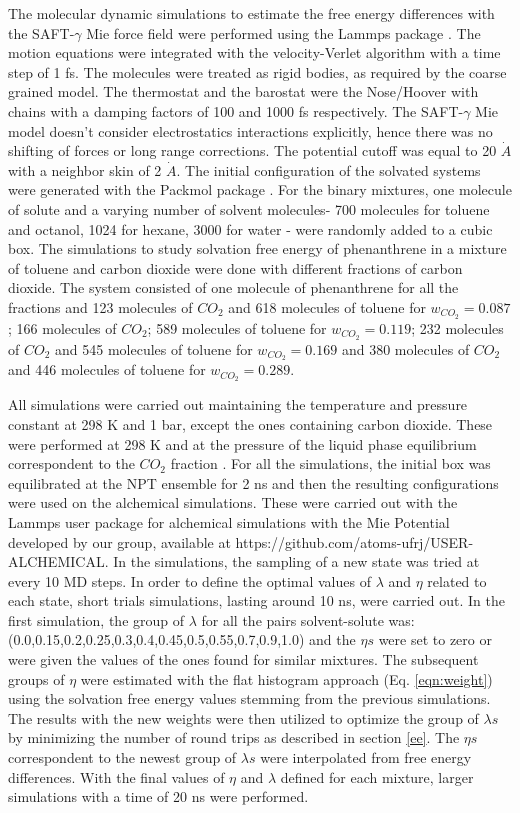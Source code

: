 The molecular dynamic simulations to estimate the free energy differences with the SAFT-$\gamma$ Mie force field were performed using the Lammps package \cite{lammps}. The motion equations were integrated with the velocity-Verlet algorithm \cite{verlet} with a time step of 1 fs. The molecules were treated as rigid bodies, as required by the coarse grained model. The thermostat and the barostat were the Nose/Hoover with chains with a damping factors of 100 and 1000 fs respectively. The SAFT-$\gamma$ Mie model doesn't consider electrostatics interactions explicitly, hence there was no shifting of forces or long range corrections. The potential cutoff was equal to 20 $\dot{A}$ \cite{muller2017} with a neighbor skin of 2 $\dot{A}$. The initial configuration of the  solvated systems were generated with the Packmol package \cite{packmol}. For the binary mixtures, one molecule of solute and a varying number of solvent molecules- 700 molecules for toluene and octanol, 1024 for hexane, 3000 for water - were randomly added to a cubic box. The simulations to study solvation free energy of phenanthrene in a mixture of toluene and carbon dioxide were done with different fractions of carbon dioxide. The  system consisted of one molecule of phenanthrene for all the fractions and 123 molecules of $CO_{2}$ and 618 molecules of toluene for $w_{CO_{2}} = 0.087$; 166 molecules of $CO_{2}$; 589 molecules of toluene for $w_{CO_{2}} = 0.119$; 232 molecules of $CO_{2}$ and 545 molecules of toluene for $w_{CO_{2}} = 0.169$ and 380 molecules of $CO_{2}$ and 446 molecules of toluene for $w_{CO_{2}} = 0.289$.

All simulations were carried out maintaining the temperature and pressure constant at 298 K and 1 bar, except the ones containing carbon dioxide. These were performed at 298 K and at the pressure of the liquid phase equilibrium correspondent to the $CO_{2}$ fraction \cite{co2toliq}. For all the simulations, the initial box was equilibrated at the NPT ensemble for 2 ns and then the resulting configurations were used on the alchemical simulations. These were carried out with the Lammps user package for alchemical simulations with the Mie Potential developed by our group, available at https://github.com/atoms-ufrj/USER-ALCHEMICAL. In the simulations, the sampling of a new state was tried at every 10 MD steps. In order to define the optimal values of $\lambda$ and $\eta$ related to each state, short trials simulations, lasting around 10 ns, were carried out. In the first simulation, the group of $\lambda$ for all the pairs solvent-solute was: (0.0,0.15,0.2,0.25,0.3,0.4,0.45,0.5,0.55,0.7,0.9,1.0) and the $\eta s$ were set to zero or were given the values of the ones found for similar mixtures. The subsequent groups of $\eta$ were estimated  with the flat histogram approach (Eq. \eqref{eqn:weight}) using the solvation free energy values stemming from the previous simulations. The results with the new weights were then utilized to optimize the group of $\lambda s$ by minimizing the number of round trips as described in section \ref{ee}. The $\eta s$ correspondent to the newest group of $\lambda s$ were interpolated from free energy differences. With the final values of $\eta$ and $\lambda $ defined for each mixture, larger simulations with a time of 20 ns were performed. 

